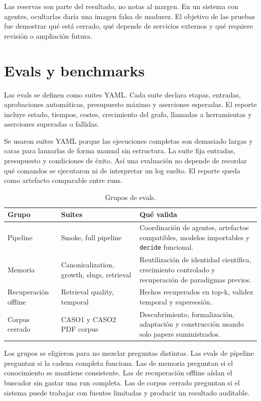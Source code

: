 Las reservas son parte del resultado, no notas al margen. En un sistema con
agentes, ocultarlas daría una imagen falsa de madurez. El objetivo de las
pruebas fue demostrar qué está cerrado, qué depende de servicios externos y qué
requiere revisión o ampliación futura.

\section{Evals y benchmarks}

Las evals se definen como suites YAML. Cada suite declara etapas, entradas,
aprobaciones automáticas, presupuesto máximo y aserciones esperadas. El reporte
incluye estado, tiempos, costes, crecimiento del grafo, llamadas a herramientas
y aserciones superadas o fallidas.

Se usaron suites YAML porque las ejecuciones completas son demasiado largas y
caras para lanzarlas de forma manual sin estructura. La suite fija entradas,
presupuesto y condiciones de éxito. Así una evaluación no depende de recordar
qué comandos se ejecutaron ni de interpretar un log suelto. El reporte queda
como artefacto comparable entre runs.

\begin{table}[H]
\begin{center}
\scriptsize
\begin{tabular}{|p{3.0cm}|p{3.1cm}|p{6.2cm}|} \hline
\textbf{Grupo} & \textbf{Suites} & \textbf{Qué valida} \\ \hline
Pipeline & Smoke, full pipeline & Coordinación de agentes, artefactos compatibles, modelos importables y \texttt{decide} funcional. \\ \hline
Memoria & Canonicalization, growth, slugs, retrieval & Reutilización de identidad científica, crecimiento controlado y recuperación de paradigmas previos. \\ \hline
Recuperación offline & Retrieval quality, temporal & Hechos recuperados en top-k, validez temporal y supersesión. \\ \hline
Corpus cerrado & CASO1 y CASO2 PDF corpus & Descubrimiento, formalización, adaptación y construcción usando solo papers suministrados. \\ \hline
\end{tabular}
\caption{Grupos de evals.}
\end{center}
\end{table}

Los grupos se eligieron para no mezclar preguntas distintas. Las evals de
pipeline preguntan si la cadena completa funciona. Las de memoria preguntan si
el conocimiento se mantiene consistente. Las de recuperación offline aíslan el
buscador sin gastar una run completa. Las de corpus cerrado preguntan si el
sistema puede trabajar con fuentes limitadas y producir un resultado auditable.

